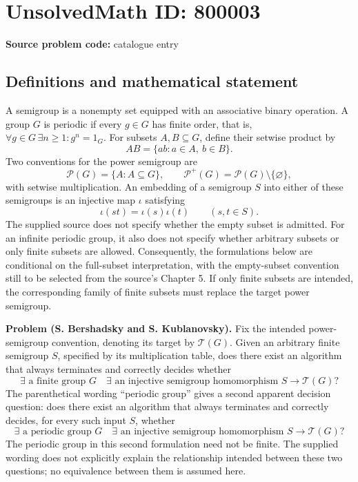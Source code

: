 \documentclass[11pt]{article}
\begin{document}
\section*{UnsolvedMath ID: 800003}
\textbf{Source problem code:} catalogue entry
\subsection{Definitions and mathematical statement}
A semigroup is a nonempty set equipped with an associative binary operation. A group \(G\) is periodic if every \(g\in G\) has finite order, that is, \(\forall g\in G\,\exists n\geq 1\colon g^n=1_G\). For subsets \(A,B\subseteq G\), define their setwise product by
\[
AB=\{ab:a\in A,\ b\in B\}.
\]
Two conventions for the power semigroup are
\[
\mathcal P(G)=\{A:A\subseteq G\},\qquad
\mathcal P^{+}(G)=\mathcal P(G)\setminus\{\varnothing\},
\]
with setwise multiplication. An embedding of a semigroup \(S\) into either of these semigroups is an injective map \(\iota\) satisfying
\[
\iota(st)=\iota(s)\iota(t)\qquad(s,t\in S).
\]
The supplied source does not specify whether the empty subset is admitted. For an infinite periodic group, it also does not specify whether arbitrary subsets or only finite subsets are allowed. Consequently, the formulations below are conditional on the full-subset interpretation, with the empty-subset convention still to be selected from the source's Chapter 5. If only finite subsets are intended, the corresponding family of finite subsets must replace the target power semigroup.

\textbf{Problem (S. Bershadsky and S. Kublanovsky).} Fix the intended power-semigroup convention, denoting its target by \(\mathcal T(G)\). Given an arbitrary finite semigroup \(S\), specified by its multiplication table, does there exist an algorithm that always terminates and correctly decides whether
\[
\exists\text{ a finite group }G\quad\exists\text{ an injective semigroup homomorphism }S\longrightarrow\mathcal T(G)?
\]
The parenthetical wording ``periodic group'' gives a second apparent decision question: does there exist an algorithm that always terminates and correctly decides, for every such input \(S\), whether
\[
\exists\text{ a periodic group }G\quad\exists\text{ an injective semigroup homomorphism }S\longrightarrow\mathcal T(G)?
\]
The periodic group in this second formulation need not be finite. The supplied wording does not explicitly explain the relationship intended between these two questions; no equivalence between them is assumed here.
\end{document}
